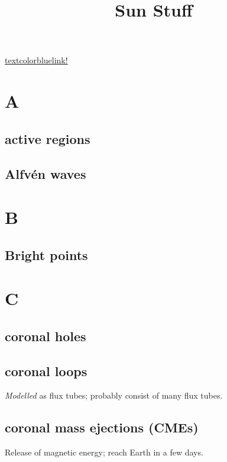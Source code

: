 \documentclass[12pt]{article}
\title{\vspace{-0.5in}Sun Stuff}
\author{}
\date{}
\begin{document}
\maketitle

\vspace{-1in}

\href{http://solarscience.msfc.nasa.gov/feature3.shtml}
{textcolor{blue}{link!}}

\section*{A}

\subsection*{active regions}

\subsection*{Alfv\'en waves}

\section*{B}
\subsection*{Bright points}

\section*{C}

\subsection*{coronal holes}

\subsection*{coronal loops}
\begin{itemize*}
    \item \emph{Modelled} as flux tubes; probably consist of
        many flux tubes.
\end{itemize*}

\subsection*{coronal mass ejections (CMEs)}
Release of magnetic energy; reach Earth in a few days.
\end{document}
